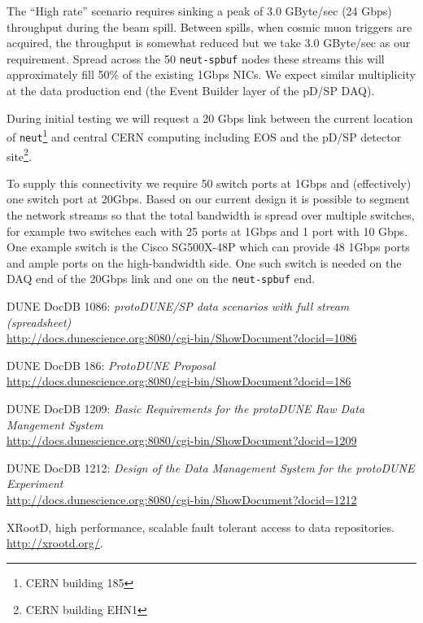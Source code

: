 \documentclass[pdftex,12pt,letter]{article}
\begin{document}
The ``High rate'' scenario requires sinking a peak of 3.0 GByte/sec
(24 Gbps) throughput during the beam spill.  Between spills, when
cosmic muon triggers are acquired, the throughput is somewhat reduced
but we take 3.0 GByte/sec as our requirement.  Spread across the 50
\texttt{neut-spbuf} nodes these streams this will approximately fill
50\% of the existing 1Gbps NICs.  We expect similar multiplicity at
the data production end (the Event Builder layer of the pD/SP DAQ).

During initial testing we will request a 20 Gbps link between the
current location of \texttt{neut}\footnote{CERN building 185} and
central CERN computing including EOS and the pD/SP detector
site\footnote{CERN building EHN1}.

To supply this connectivity we require 50 switch ports at 1Gbps and
(effectively) one switch port at 20Gbps.  Based on our current design
it is possible to segment the network streams so that the total
bandwidth is spread over multiple switches, for example two switches
each with 25 ports at 1Gbps and 1 port with 10 Gbps.  One example
switch is the Cisco SG500X-48P which can provide 48 1Gbps ports and
ample ports on the high-bandwidth side.  One such switch is needed on
the DAQ end of the 20Gbps link and one on the \texttt{neut-spbuf} end.

\begin{thebibliography}{1}
{DUNE DocDB 1086: \textit{ protoDUNE/SP data scenarios with full stream (spreadsheet)}}\\
\url{http://docs.dunescience.org:8080/cgi-bin/ShowDocument?docid=1086}

{DUNE DocDB 186: \textit{ ProtoDUNE Proposal}}\\
\url{http://docs.dunescience.org:8080/cgi-bin/ShowDocument?docid=186}


{DUNE DocDB 1209: \textit{Basic Requirements for the protoDUNE Raw Data Mangement System}}\\
\url{http://docs.dunescience.org:8080/cgi-bin/ShowDocument?docid=1209}


{DUNE DocDB 1212: \textit{Design of the Data Management System for the protoDUNE Experiment}}\\
\url{http://docs.dunescience.org:8080/cgi-bin/ShowDocument?docid=1212}



{XRootD, high performance, scalable fault tolerant access to data  repositories}.\\
  \url{http://xrootd.org/}.

\end{thebibliography}
\end{document}

